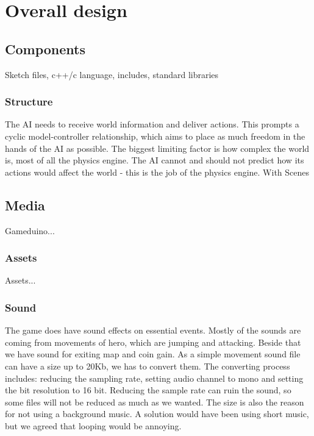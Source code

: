 \chapter{Overall design}

\section{Components}
Sketch files, c++/c language, includes, standard libraries

\subsection{Structure}
The AI needs to receive world information and deliver actions. This prompts a cyclic model-controller relationship, which aims to place as much freedom in the hands of the AI as possible. The biggest limiting factor is how complex the world is, most of all the physics engine. The AI cannot and should not predict how its actions would affect the world - this is the job of the physics engine. With
Scenes

\section{Media}
Gameduino...

\subsection{Assets}
Assets...

\subsection{Sound}
The game does have sound effects on essential events. Mostly of the sounds
are coming from movements of hero, which are jumping and attacking.
Beside that we have sound for exiting map and coin gain. As a simple
movement sound file can have a size up to 20Kb, we has to convert them. The converting
process includes: reducing the sampling rate, setting audio channel to mono and setting
the bit resolution to 16 bit. Reducing the sample rate can ruin the sound, so some files
will not be reduced as much as we wanted. The size is also the reason for not using a
background music. A solution would have been using short music, but we agreed that
looping would be annoying.

